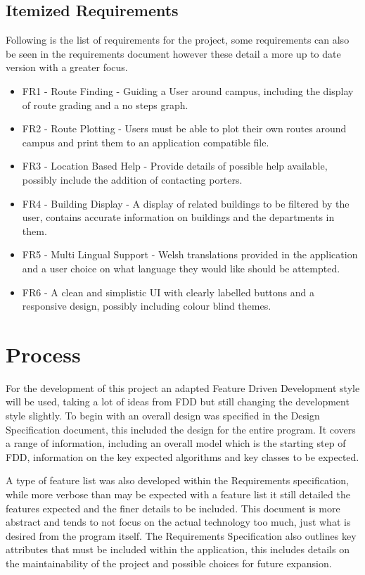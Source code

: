 \subsection{Itemized Requirements}
Following is the list of requirements for the project, some requirements can also be seen in the requirements document however these detail a more up to date version with a greater focus.
\begin{itemize}
	\item FR1 - Route Finding - Guiding a User around campus, including the display of route grading and a no steps graph.
	\item FR2 - Route Plotting - Users must be able to plot their own routes around campus and print them to an application compatible file.
	\item FR3 - Location Based Help - Provide details of possible help available, possibly include the addition of contacting porters. 
	\item FR4 - Building Display - A display of related buildings to be filtered by the user, contains accurate information on buildings and the departments in them. 
	\item FR5 - Multi Lingual Support - Welsh translations provided in the application and a user choice on what language they would like should be attempted. 
	\item FR6 - A clean and simplistic UI with clearly labelled buttons and a responsive design, possibly including colour blind themes.
\end{itemize}
\section{Process}
For the development of this project an adapted Feature Driven Development style will be used, taking a lot of ideas from FDD but still changing the development style slightly. To begin with an overall design was specified in the Design Specification document, this included the design for the entire program. It covers a range of information, including an overall model which is the starting step of FDD, information on the key expected algorithms and key classes to be expected. 

A type of feature list was also developed within the Requirements specification, while more verbose than may be expected with a feature list it still detailed the features expected and the finer details to be included. This document is more abstract and tends to not focus on the actual technology too much, just what is desired from the program itself. The Requirements Specification also outlines key attributes that must be included within the application, this includes details on the maintainability of the project and possible choices for future expansion. 


